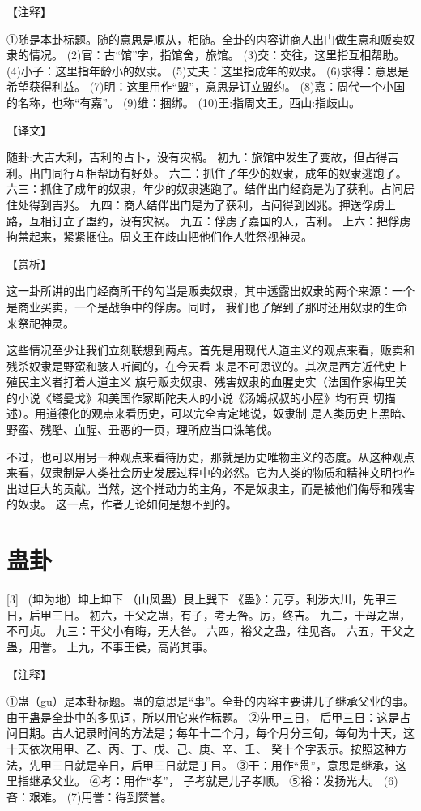 \documentclass[12pt,UTF8]{ctexbook}
\begin{document}
【注释】

①随是本卦标题。随的意思是顺从，相随。全卦的内容讲商人出门做生意和贩卖奴隶的情况。
(2)官：古“馆”字，指馆舍，旅馆。
(3)交：交往，这里指互相帮助。
(4)小子：这里指年龄小的奴隶。
(5)丈夫：这里指成年的奴隶。
(6)求得：意思是希望获得利益。
(7)明：这里用作“盟”，意思是订立盟约。
(8)嘉：周代一个小国的名称，也称“有嘉”。
(9)维：捆绑。
(10)王:指周文王。西山:指歧山。

【译文】

随卦:大吉大利，吉利的占卜，没有灾祸。
初九：旅馆中发生了变故，但占得吉利。出门同行互相帮助有好处。
六二：抓住了年少的奴隶，成年的奴隶逃跑了。
六三：抓住了成年的奴隶，年少的奴隶逃跑了。结伴出门经商是为了获利。占问居住处得到吉兆。
九四：商人结伴出门是为了获利，占问得到凶兆。押送俘虏上路，互相订立了盟约，没有灾祸。
九五：俘虏了嘉国的人，吉利。
上六：把俘虏拘禁起来，紧紧捆住。周文王在歧山把他们作人牲祭视神灵。

【赏析】

这一卦所讲的出门经商所干的勾当是贩卖奴隶，其中透露出奴隶的两个来源：一个是商业买卖，一个是战争中的俘虏。同时， 我们也了解到了那时还用奴隶的生命来祭祀神灵。

这些情况至少让我们立刻联想到两点。首先是用现代人道主义的观点来看，贩卖和残杀奴隶是野蛮和骇人听闻的，在今天看 来是不可思议的。其次是西方近代史上殖民主义者打着人道主义 旗号贩卖奴隶、残害奴隶的血腥史实（法国作家梅里美的小说《塔曼戈》和美国作家斯陀夫人的小说《汤姆叔叔的小屋》均有真 切描述）。用道德化的观点来看历史，可以完全肯定地说，奴隶制 是人类历史上黑暗、野蛮、残酷、血腥、丑恶的一页，理所应当口诛笔伐。

不过，也可以用另一种观点来看待历史，那就是历史唯物主义的态度。从这种观点来看，奴隶制是人类社会历史发展过程中的必然。它为人类的物质和精神文明也作出过巨大的贡献。当然，这个推动力的主角，不是奴隶主，而是被他们侮辱和残害的奴隶。 这一点，作者无论如何是想不到的。

\chapter{蛊卦}
[3] \ (坤为地）坤上坤下
（山风蛊）艮上巽下
《蛊》：元亨。利涉大川，先甲三日，后甲三日。
初六，干父之蛊，有子，考无咎。厉，终吉。
九二，干母之蛊，不可贞。
九三：干父小有晦，无大咎。
六四，裕父之蛊，往见吝。
六五，干父之蛊，用誉。
上九，不事王侯，高尚其事。

【注释】

①蛊（gu）是本卦标题。蛊的意思是“事”。全卦的内容主要讲儿子继承父业的事。由于蛊是全卦中的多见词，所以用它来作标题。
②先甲三日， 后甲三日：这是占问日期。古人记录时间的方法是；每年十二个月，每个月分三旬，每旬为十天，这十天依次用甲、乙、丙、丁、戊、己、庚、辛、壬、 癸十个字表示。按照这种方法，先甲三日就是辛日，后甲三日就是丁目。
③干：用作“贯”，意思是继承，这里指继承父业。
④考：用作“孝”， 子考就是儿子孝顺。
⑤裕：发扬光大。
(6)吝：艰难。
(7)用誉：得到赞誉。
\end{document}
